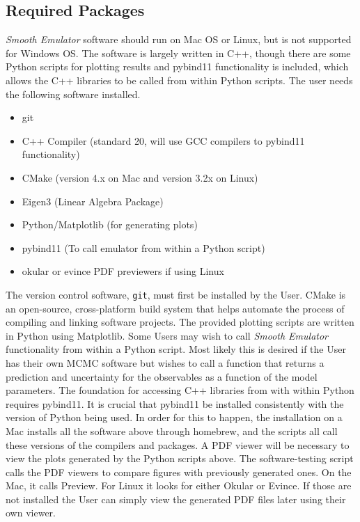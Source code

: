 \documentclass[UserManual.tex]{subfiles}
\begin{document}
\begin{sloppypar}
\subsection{Required Packages}
{\it Smooth Emulator} software should run on Mac OS or Linux, but is not supported for Windows OS. The software is largely  written in C++, though there are some Python scripts for plotting results and pybind11 functionality is included, which allows the C++ libraries to be called from within Python scripts. The user needs the following software installed.
\begin{itemize}\itemsep=0pt
	\item git
    \item C++ Compiler (standard 20, will use GCC compilers to pybind11 functionality)
    \item CMake (version 4.x on Mac and version 3.2x on Linux)
    \item Eigen3 (Linear Algebra Package)
    \item Python/Matplotlib (for generating plots)
    \item pybind11 (To call emulator from within a Python script)
    \item okular or evince PDF previewers if using Linux
\end{itemize}
\vspace*{-10pt}
The version control software, {\tt git}, must first be installed by the User. CMake is an open-source, cross-platform build system that helps automate the process of compiling and linking software projects. The provided plotting scripts are written in Python using Matplotlib. Some Users may wish to call {\it Smooth Emulator} functionality from within a Python script. Most likely this is desired if the User has their own MCMC software but wishes to call a function that returns a prediction and uncertainty for the observables as a function of the model parameters. The foundation for accessing C++ libraries from with within Python requires pybind11. It is crucial that pybind11 be installed consistently with the version of Python being used. In order for this to happen, the installation on a Mac installs all the software above through homebrew, and the scripts all call these versions of the compilers and packages. A PDF viewer will be necessary to view the plots generated by the Python scripts above. The software-testing script calls the PDF viewers to compare figures with previously generated ones. On the Mac, it calls Preview. For Linux it looks for either Okular or Evince. If those are not installed the User can simply view the generated PDF files later using their own viewer.


\end{sloppypar}
\end{document}
